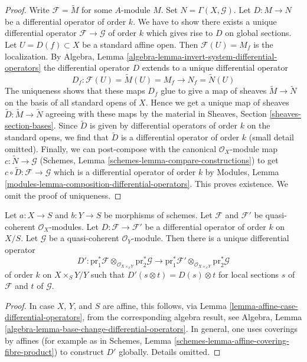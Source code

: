 \begin{proof}
Write $\mathcal{F} = \widetilde{M}$ for some $A$-module $M$. Set
$N = \Gamma(X, \mathcal{G})$. Let $D : M \to N$ be a differential
operator of order $k$. We have to show there exists
a unique differential operator $\mathcal{F} \to \mathcal{G}$ of order $k$
which gives rise to $D$ on global sections. Let $U = D(f) \subset X$
be a standard affine open. Then $\mathcal{F}(U) = M_f$ is the localization.
By Algebra, Lemma \ref{algebra-lemma-invert-system-differential-operators}
the differential operator $D$ extends to a unique differential operator
$$
D_f : \mathcal{F}(U) = \widetilde{M}(U) = M_f \to N_f = \widetilde{N}(U)
$$
The uniqueness shows that these maps $D_f$ glue to give a map of sheaves
$\widetilde{M} \to \widetilde{N}$ on the basis of all standard opens
of $X$. Hence we get a unique map of sheaves
$\widetilde{D} : \widetilde{M} \to \widetilde{N}$ agreeing with these maps
by the material in Sheaves, Section \ref{sheaves-section-bases}.
Since $\widetilde{D}$ is given by differential operators of order $k$ on
the standard opens, we find that $\widetilde{D}$ is a differential operator
of order $k$ (small detail omitted).
Finally, we can post-compose with the canonical $\mathcal{O}_X$-module map
$c : \widetilde{N} \to \mathcal{G}$
(Schemes, Lemma \ref{schemes-lemma-compare-constructions})
to get $c \circ \widetilde{D} : \mathcal{F} \to \mathcal{G}$
which is a differential operator of order $k$ by
Modules, Lemma \ref{modules-lemma-composition-differential-operators}.
This proves existence. We omit the proof of uniqueness.
\end{proof}

\begin{lemma}
\label{lemma-base-change-differential-operators}
Let $a : X \to S$ and $b : Y \to S$ be morphisms of schemes.
Let $\mathcal{F}$ and $\mathcal{F}'$ be quasi-coherent $\mathcal{O}_X$-modules.
Let $D : \mathcal{F} \to \mathcal{F}'$ be a differential operator
of order $k$ on $X/S$. Let $\mathcal{G}$ be a quasi-coherent
$\mathcal{O}_Y$-module. Then there is a unique differential
operator
$$
D' :
\text{pr}_1^*\mathcal{F} \otimes_{\mathcal{O}_{X \times_S Y}}
\text{pr}_2^*\mathcal{G}
\longrightarrow
\text{pr}_1^*\mathcal{F}' \otimes_{\mathcal{O}_{X \times_S Y}}
\text{pr}_2^*\mathcal{G}
$$
of order $k$ on $X \times_S Y / Y$ such that
$
D'(s \otimes t) = D(s) \otimes t
$
for local sections $s$ of $\mathcal{F}$ and $t$ of $\mathcal{G}$.
\end{lemma}

\begin{proof}
In case $X$, $Y$, and $S$ are affine, this follows, via
Lemma \ref{lemma-affine-case-differential-operators},
from the corresponding algebra result, see
Algebra, Lemma \ref{algebra-lemma-base-change-differential-operators}.
In general, one uses coverings by affines
(for example as in Schemes, Lemma
\ref{schemes-lemma-affine-covering-fibre-product})
to construct $D'$ globally. Details omitted.
\end{proof}

